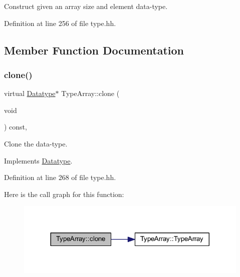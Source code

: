 Construct given an array size and element data-\/type. 



Definition at line 256 of file type.\+hh.



\subsection{Member Function Documentation}
\mbox{\label{class_type_array_ad08c84ac6e8382fe9f930b4eacb275ce}} 
\subsubsection{\texorpdfstring{clone()}{clone()}}
{\footnotesize\ttfamily virtual \mbox{\hyperlink{class_datatype}{Datatype}}$\ast$ Type\+Array\+::clone (\begin{DoxyParamCaption}\item[{void}]{ }\end{DoxyParamCaption}) const\hspace{0.3cm}{\ttfamily [inline]}, {\ttfamily [virtual]}}



Clone the data-\/type. 



Implements \mbox{\hyperlink{class_datatype_a6bd032d91f40efe36841adc85b3ff0ec}{Datatype}}.



Definition at line 268 of file type.\+hh.

Here is the call graph for this function\+:
\nopagebreak
\begin{figure}[H]
\begin{center}
\leavevmode
\includegraphics[width=317pt]{class_type_array_ad08c84ac6e8382fe9f930b4eacb275ce_cgraph}
\end{center}
\end{figure}
\mbox{\label{class_type_array_a25246a42499f1bc0f9a6c8c5f8224c74}} 
